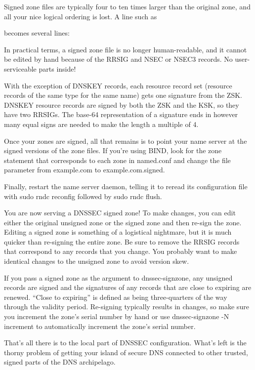 
Signed zone files are typically four to ten times larger than the
original zone, and all your nice logical ordering is lost. A line such
as


becomes several lines:


In practical terms, a signed zone file is no longer human-readable, and
it cannot be edited by hand because of the RRSIG and NSEC or NSEC3
records. No user-serviceable parts inside!

With the exception of DNSKEY records, each resource record set (resource
records of the same type for the same name) gets one signature from the
ZSK. DNSKEY resource records are signed by both the ZSK and the KSK, so
they have two RRSIGs. The base-64 representation of a signature ends in
however many equal signs are needed to make the length a multiple of 4.

Once your zones are signed, all that remains is to point your name
server at the signed versions of the zone files. If you're using BIND,
look for the {zone} statement that corresponds to each zone in
{named.conf} and change the {file} parameter from {example.com} to
{example.com.signed}.

Finally, restart the name server daemon, telling it to reread its
configuration file with {sudo rndc reconfig} followed by {sudo rndc
flush}.

You are now serving a DNSSEC signed zone! To make changes, you can edit
either the original unsigned zone or the signed zone and then re-sign
the zone. Editing a signed zone is something of a logistical nightmare,
but it is much quicker than re-signing the entire zone. Be sure to
remove the RRSIG records that correspond to any records that you change.
You probably want to make identical changes to the unsigned zone to
avoid version skew.

If you pass a signed zone as the argument to {dnssec-signzone}, any
unsigned records are signed and the signatures of any records that are
close to expiring are renewed. ``Close to expiring'' is defined as being
three-quarters of the way through the validity period. Re-signing
typically results in changes, so make sure you increment the zone's
serial number by hand or use {dnssec-signzone -N increment} to
automatically increment the zone's serial number.

That's all there is to the local part of DNSSEC configuration. What's
left is the thorny problem of getting your island of secure DNS
connected to other trusted, signed parts of the DNS archipelago.

